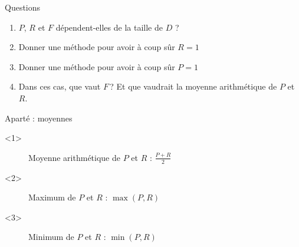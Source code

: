 \documentclass[xcolor={svgnames}, french]{beamer}
\begin{document}
\begin{frame}{Questions}
	\begin{enumerate}
		\item $P$, $R$ et $F$ dépendent-elles de la taille de $D$ ?
		\item Donner une méthode pour avoir à coup sûr $R=1$
		\item Donner une méthode pour avoir à coup sûr $P=1$
		\item Dans ces cas, que vaut $F$ ? Et que vaudrait la moyenne arithmétique de $P$ et $R$.
	\end{enumerate}
\end{frame}

\begin{frame}[fragile]{Aparté : moyennes}
	\begin{onlyenv}
		\begin{figure}
			\tikzset{external/export=true}
			\caption{Moyenne arithmétique de $P$ et $R$ : $\frac{P+R}{2}$}
		\end{figure}
	\end{onlyenv}
	\begin{onlyenv}
		\begin{figure}
			\tikzset{external/export=true}
			\caption{Maximum de $P$ et $R$ : $\max(P, R)$}
		\end{figure}
	\end{onlyenv}
	\begin{onlyenv}
		\begin{figure}
			\tikzset{external/export=true}
		\caption{Minimum de $P$ et $R$ : $\min(P, R)$}
		\end{figure}
	\end{onlyenv}

\end{frame}
\end{document}
